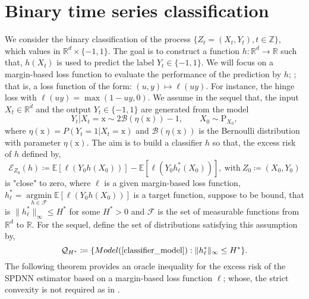 \documentclass[10pt,twoside]{article}
\numberwithin{equation}{section}
\newcommand{\E}{\ensuremath{\mathbb{E}}}
\newcommand{\R}{\ensuremath{\mathbb{R}}}
\newcommand{\Z}{\ensuremath{\mathbb{Z}}}
\DeclareMathOperator*{\argmin}{argmin}
\begin{document}
\section{Binary time series classification}\label{classification}
%
We consider the binary classification of the process $\{Z_t =(X_t, Y_t), t \in \Z \} $, which values in $\R^d \times \{-1, 1\}$. 
% 
The goal is to construct a function $h: \R^d \rightarrow \R$ such that, $ h (X_t) $ is used to predict the label $ Y_t \in \{-1, 1\} $.
%
We will focus on a  margin-based loss function  to evaluate  the performance of  the prediction   by $h$;
;
%
that is, a loss function of the form: $(u,y) \mapsto \ell(uy)$. For instance, the hinge loss with $\ell(uy) = \max(1-uy, 0)$. 
%
 We assume in the sequel that, the input $ X_t \in \R^d$ and  the output $ Y_t  \in  \{-1, 1 \} $ are generated from the model 
 \begin{equation}\label{classifier_model}
Y_t  \vert X_t = \text{x}  \sim 2 \mathcal{B} (\eta ( \text{x})) - 1,  \qquad X_0 \sim \text{P}_ {X_0},
 \end{equation}
%
where $\eta( \text{x}) = P (Y_t = 1 \vert X_t = \text{x}) $ and $\mathcal{B} (\eta (\text{x})) $ is the Bernoulli distribution with parameter $ \eta (\text{x}) $.
%
The aim is to build a classifier $h$ so that, the excess risk of $h$ defined by,
%
\begin{equation}\label{def_excess_risk}
\mathcal{E}_{Z_0} (h) \coloneqq \E [\ell (Y_0  h(X_0))] - \E [\ell(Y_0 h_ {\ell}^ {*} (X_0))], ~ \text{with}~ Z_0 \coloneqq (X_0, Y_0)
\end{equation} 
%
is "close" to zero, where $\ell$ is a given margin-based loss 
  function, $h_ {\ell}^ {*} = \underset{h \in \mathcal{F}}{\argmin} \E \left[ \ell (Y_0 h (X_0))  \right]$ is a target function, suppose to be bound, that is $ \| h_ { \ell}^ {*} \|_{\infty} \leq H^ {*}$ for some $H^ {*} > 0$ and $\mathcal{F} $ is the set of measurable functions from $\R^d$ to $\R$.
% 
%
For the sequel, define the set of distributions satisfying this assumption by, 
%
\begin{equation}
\mathcal{ Q}_ { H^ {*}} \coloneqq \{ Model (\ref{classifier_model}):  \| h_{ \ell}^ {*} \|_{\infty} \leq H^ {*} \}.
\end{equation}
%
%
The following theorem provides an oracle inequality for the excess risk of the SPDNN estimator based on a margin-based loss function $\ell$; whose, the strict convexity is not required as in \cite{ohn2022nonconvex}.
%
%
\end{document}
